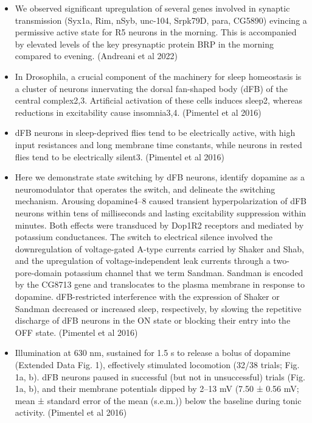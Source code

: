 \documentclass[11pt]{article}
\begin{document}
\begin{itemize}
    \item We observed significant upregulation of several genes involved in synaptic transmission (Syx1a, Rim, nSyb, unc-104, Srpk79D, para, CG5890) evincing a permissive active state for R5 neurons in the morning. This is accompanied by elevated levels of the key presynaptic protein BRP in the morning compared to evening.
    \parencite{andreaniCircadianProgrammingEllipsoid2022} (Andreani et al 2022)

    \item In Drosophila, a crucial component of the machinery for sleep homeostasis is a cluster of neurons innervating the  dorsal fan-shaped body (dFB) of the central complex2,3. Artificial  activation of these cells induces sleep2, whereas reductions in  excitability cause insomnia3,4.
    \parencite{pimentelOperationHomeostaticSleep2016} (Pimentel et al 2016)

    \item dFB neurons in sleep-deprived flies tend to be electrically active, with high input resistances and long membrane time constants, while neurons in rested flies tend to be  electrically silent3.
    \parencite{pimentelOperationHomeostaticSleep2016} (Pimentel et al 2016)

    \item Here we demonstrate state switching by dFB neurons, identify dopamine as a neuromodulator that operates the switch, and delineate the  switching mechanism. Arousing dopamine4–8 caused transient hyperpolarization of dFB neurons within tens of milliseconds and lasting excitability suppression within minutes. Both effects were transduced by Dop1R2 receptors and mediated by potassium conductances. The switch to electrical silence involved the downregulation of voltage-gated A-type currents carried by Shaker and Shab, and the upregulation of voltage-independent leak currents through a two-pore-domain potassium channel that we term Sandman. Sandman is encoded by the CG8713 gene and translocates to the plasma membrane in response to dopamine. dFB-restricted interference with the expression of Shaker or Sandman decreased or increased sleep, respectively, by slowing the repetitive discharge of dFB neurons in the ON state or blocking their entry into the OFF state.
    \parencite{pimentelOperationHomeostaticSleep2016} (Pimentel et al 2016)

    \item Illumination at 630 nm, sustained for 1.5 s to release a bolus of dopamine (Extended Data Fig. 1), effectively stimulated locomotion (32/38 trials; Fig. 1a, b). dFB neurons paused in successful (but not in unsuccessful) trials (Fig. 1a, b), and their membrane potentials dipped by 2–13 mV (7.50 ± 0.56 mV; mean ± standard error of the mean (s.e.m.)) below the baseline during tonic activity.
    \parencite{pimentelOperationHomeostaticSleep2016} (Pimentel et al 2016)


\end{itemize}
\end{document}
